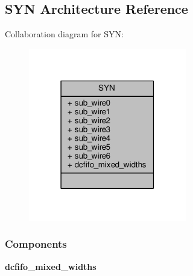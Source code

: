 \subsection{S\+YN Architecture Reference}
\label{classtx__outfifo__16__to__32_1_1SYN}


Collaboration diagram for S\+YN\+:\nopagebreak
\begin{figure}[H]
\begin{center}
\leavevmode
\includegraphics[width=195pt]{d3/d21/classtx__outfifo__16__to__32_1_1SYN__coll__graph}
\end{center}
\end{figure}
\subsubsection*{Components}
 \begin{DoxyCompactItemize}
\item 
{\bf dcfifo\+\_\+mixed\+\_\+widths}  {\bfseries }  
\end{DoxyCompactItemize}
